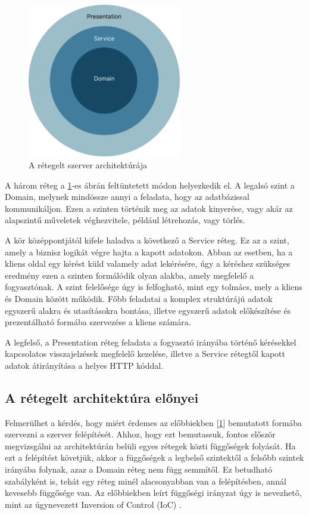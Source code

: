 \begin{figure}[h]
    \centering
    \includegraphics[width=0.6\textwidth]{./images/backend_onion_architecture.png}
    \caption{A rétegelt szerver architektúrája}
    \label{fig:server_onion_architecture}
\end{figure}

A három réteg a \ref{fig:server_onion_architecture}-es ábrán feltüntetett módon helyezkedik el. A legalsó szint a Domain, melynek mindössze annyi a feladata, hogy az adatbázissal kommunikáljon. Ezen a szinten történik meg az adatok kinyerése, vagy akár az alapszintű műveletek véghezvitele, például létrehozás, vagy törlés.

A kör középpontjától kifele haladva a következő a Service réteg. Ez az a szint, amely a biznisz logikát végre hajta a kapott adatokon. Abban az esetben, ha a kliens oldal egy kérést küld valamely adat lekérésére, úgy a kéréshez szükséges eredmény ezen a szinten formálódik olyan alakba, amely megfelelő a fogyasztónak. A szint felelősége úgy is felfogható, mint egy tolmács, mely a kliens és Domain között működik. Főbb feladatai a komplex struktúrájú adatok egyszerű alakra és utasításokra bontása, illetve egyszerű adatok előkészítése és prezentálható formába szervezése a kliens számára.

A legfelső, a Presentation réteg feladata a fogyasztó irányába történő kérésekkel kapcsolatos visszajelzések megfelelő kezelése, illetve a Service rétegtől kapott adatok átirányítása a helyes HTTP kóddal.

\subsection{A rétegelt architektúra előnyei}

Felmerülhet a kérdés, hogy miért érdemes az előbbiekben [\ref{fig:server_onion_architecture}] bemutatott formába szervezni a szerver felépítését. 
Ahhoz, hogy ezt bemutassuk, fontos először megvizsgálni az architektúrán belüli egyes rétegek közti függőségek folyását. 
Ha ezt a felépítést követjük, akkor a függőségek a legbelső szintektől a felsőbb szintek irányába folynak, azaz a Domain réteg nem függ semmítől. 
Ez betudható szabályként is, tehát egy réteg minél alacsonyabban van a felépítésben, annál kevesebb függősége van.
Az előbbiekben leírt függőségi irányzat úgy is nevezhető, mint az úgynevezett Inversion of Control (IoC) \cite{inversionofcontroldocs}.

